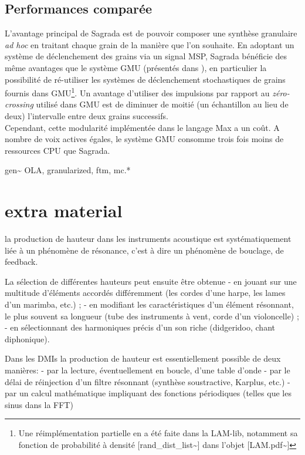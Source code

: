 \subsection{Performances comparée}

\noindent L'avantage principal de Sagrada est de pouvoir composer une synthèse granulaire \textit{ad hoc} en traitant chaque grain de la manière que l'on souhaite. En adoptant un système de déclenchement des grains via un signal \gls{MSP}, Sagrada bénéficie des même avantages que le système \gls{GMU} (présentés dans \cite{bascou_gmu_2005}), en particulier la possibilité de ré-utiliser les systèmes de déclenchement stochastiques de grains fournis dans \gls{GMU}\footnote{Une réimplémentation partielle en a été faite dans la LAM-lib, notamment sa fonction de probabilité à densité [rand\_dist\_list\textasciitilde{}] dans l'objet [LAM.pdf\textasciitilde{}]}. Un avantage d'utiliser des impulsions par rapport au \textit{zéro-crossing} utilisé dans GMU est de diminuer de moitié (un échantillon au lieu de deux) l'intervalle entre deux grains successifs.\\
\indent Cependant, cette modularité implémentée dans le langage Max a un coût. A nombre de voix actives égales, le système \gls{GMU} consomme trois fois moins de ressources \gls{CPU} que Sagrada.


gen\textasciitilde{ } OLA, granularized, ftm, mc.*


\section*{extra material}

la production de hauteur dans les instruments acoustique est systématiquement liée à un phénomène de résonance, c'est à dire un phénomène de bouclage, de feedback. 

La sélection de différentes hauteurs peut ensuite être obtenue 
- en jouant sur une multitude d'éléments accordés différemment (les cordes d'une harpe, les lames
d'un marimba, etc.) ;
- en modifiant les caractéristiques d'un élément résonnant, le plus souvent sa longueur (tube des
instruments à vent, corde d'un violoncelle) ;
- en sélectionnant des harmoniques précis d'un son riche (didgeridoo, chant diphonique).


Dans les DMIs la production de hauteur est essentiellement possible de deux manières: 
- par la lecture, éventuellement en boucle, d'une table d'onde
- par le délai de réinjection d'un filtre résonnant (synthèse soustractive, Karplus, etc.)
- par un calcul mathématique impliquant des fonctions périodiques (telles que les sinus dans la FFT)


